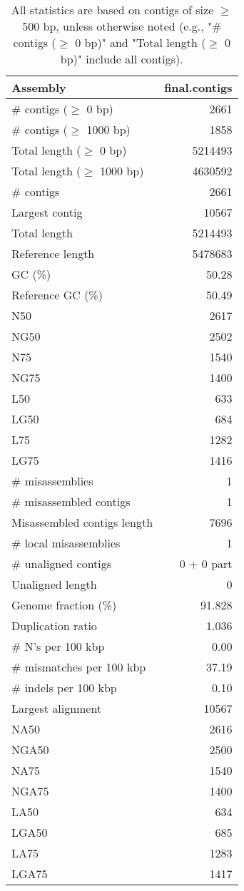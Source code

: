 \documentclass[12pt,a4paper]{article}
\begin{document}
\begin{table}[ht]
\begin{center}
\caption{All statistics are based on contigs of size $\geq$ 500 bp, unless otherwise noted (e.g., "\# contigs ($\geq$ 0 bp)" and "Total length ($\geq$ 0 bp)" include all contigs).}
\begin{tabular}{|l*{1}{|r}|}
\hline
Assembly & final.contigs \\ \hline
\# contigs ($\geq$ 0 bp) & 2661 \\ \hline
\# contigs ($\geq$ 1000 bp) & 1858 \\ \hline
Total length ($\geq$ 0 bp) & 5214493 \\ \hline
Total length ($\geq$ 1000 bp) & 4630592 \\ \hline
\# contigs & 2661 \\ \hline
Largest contig & 10567 \\ \hline
Total length & 5214493 \\ \hline
Reference length & 5478683 \\ \hline
GC (\%) & 50.28 \\ \hline
Reference GC (\%) & 50.49 \\ \hline
N50 & 2617 \\ \hline
NG50 & 2502 \\ \hline
N75 & 1540 \\ \hline
NG75 & 1400 \\ \hline
L50 & 633 \\ \hline
LG50 & 684 \\ \hline
L75 & 1282 \\ \hline
LG75 & 1416 \\ \hline
\# misassemblies & 1 \\ \hline
\# misassembled contigs & 1 \\ \hline
Misassembled contigs length & 7696 \\ \hline
\# local misassemblies & 1 \\ \hline
\# unaligned contigs & 0 + 0 part \\ \hline
Unaligned length & 0 \\ \hline
Genome fraction (\%) & 91.828 \\ \hline
Duplication ratio & 1.036 \\ \hline
\# N's per 100 kbp & 0.00 \\ \hline
\# mismatches per 100 kbp & 37.19 \\ \hline
\# indels per 100 kbp & 0.10 \\ \hline
Largest alignment & 10567 \\ \hline
NA50 & 2616 \\ \hline
NGA50 & 2500 \\ \hline
NA75 & 1540 \\ \hline
NGA75 & 1400 \\ \hline
LA50 & 634 \\ \hline
LGA50 & 685 \\ \hline
LA75 & 1283 \\ \hline
LGA75 & 1417 \\ \hline
\end{tabular}
\end{center}
\end{table}
\end{document}
